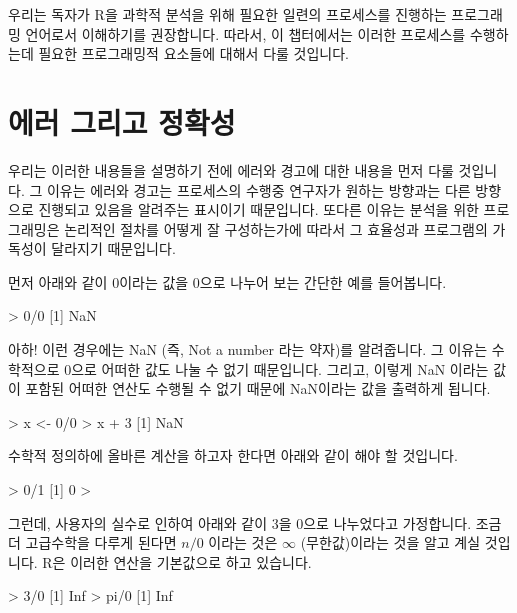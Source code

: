 우리는 독자가 R을 과학적 분석을 위해 필요한 일련의 프로세스를 진행하는 프로그래밍 언어로서 이해하기를 권장합니다.
따라서, 이 챕터에서는 이러한 프로세스를 수행하는데 필요한 프로그래밍적 요소들에 대해서 다룰 것입니다. 


\section{에러 그리고 정확성}

우리는 이러한 내용들을 설명하기 전에 에러와 경고에 대한 내용을 먼저 다룰 것입니다. 
그 이유는 에러와 경고는 프로세스의 수행중 연구자가 원하는 방향과는 다른 방향으로 진행되고 있음을 알려주는 표시이기 때문입니다. 
또다른 이유는 분석을 위한 프로그래밍은 논리적인 절차를 어떻게 잘 구성하는가에 따라서 그 효율성과 프로그램의 가독성이 달라지기 때문입니다. 

먼저 아래와 같이 0이라는 값을 0으로 나누어 보는 간단한 예를 들어봅니다. 

\begin{Schunk}
\begin{Soutput}
> 0/0
[1] NaN
\end{Soutput}
\end{Schunk}

아하! 이런 경우에는 NaN (즉, Not a number 라는 약자)를 알려줍니다. 
그 이유는 수학적으로 0으로 어떠한 값도 나눌 수 없기 때문입니다. 
그리고, 이렇게 NaN 이라는 값이 포함된 어떠한 연산도 수행될 수 없기 때문에 NaN이라는 값을 출력하게 됩니다. 

\begin{Schunk}
\begin{Soutput}
> x <- 0/0
> x + 3
[1] NaN
\end{Soutput}
\end{Schunk}

수학적 정의하에 올바른 계산을 하고자 한다면 아래와 같이 해야 할 것입니다. 

\begin{Schunk}
\begin{Soutput}
> 0/1
[1] 0
> 
\end{Soutput}
\end{Schunk}

그런데, 사용자의 실수로 인하여 아래와 같이 3을 0으로 나누었다고 가정합니다. 
조금더 고급수학을 다루게 된다면 $n/0$ 이라는 것은 $\infty$ (무한값)이라는 것을 알고 계실 것입니다.
R은 이러한 연산을 기본값으로 하고 있습니다. 

\begin{Schunk}
\begin{Soutput}
> 3/0
[1] Inf
> pi/0
[1] Inf
\end{Soutput}
\end{Schunk}

